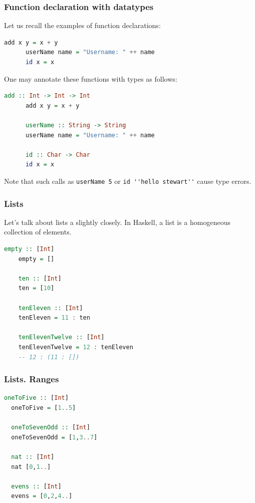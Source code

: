 \documentclass[10pt,pdf,utf8,russian,aspectratio=169]{beamer}
\begin{document}
\begin{frame}[fragile]
  \frametitle{Function declaration with datatypes}

  Let us recall the examples of function declarations:

    \begin{lstlisting}[language=Haskell]
      add x y = x + y
      userName name = "Username: " ++ name
      id x = x
    \end{lstlisting}

    \vspace{\baselineskip}

    One may annotate these functions with types as follows:

    \begin{lstlisting}[language=Haskell]
      add :: Int -> Int -> Int
      add x y = x + y

      userName :: String -> String
      userName name = "Username: " ++ name

      id :: Char -> Char
      id x = x
    \end{lstlisting}

\vspace{\baselineskip}

  Note that such calls as \verb"userName 5" or \verb"id ''hello stewart''" cause type errors.

\end{frame}

\begin{frame}[fragile]
  \frametitle{Lists}

  Let's talk about lists a slightly closely. In Haskell, a list is a homogeneous collection of elements.

  \begin{lstlisting}[language=Haskell]
    empty :: [Int]
    empty = []

    ten :: [Int]
    ten = [10]

    tenEleven :: [Int]
    tenEleven = 11 : ten

    tenElevenTwelve :: [Int]
    tenElevenTwelve = 12 : tenEleven
    -- 12 : (11 : [])
  \end{lstlisting}

\end{frame}

\begin{frame}[fragile]
  \frametitle{Lists. Ranges}

  \begin{lstlisting}[language=Haskell]
  oneToFive :: [Int]
  oneToFive = [1..5]

  oneToSevenOdd :: [Int]
  oneToSevenOdd = [1,3..7]

  nat :: [Int]
  nat [0,1..]

  evens :: [Int]
  evens = [0,2,4..]
  \end{lstlisting}
\end{frame}
\end{document}
